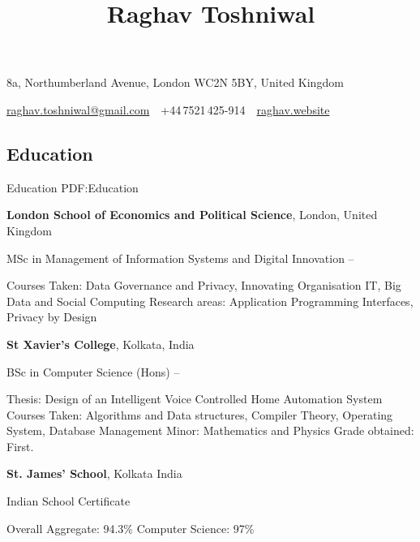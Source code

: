 \documentclass[letterpaper,10pt,oneside]{article}
\newcommand{\CVAuthor}{Raghav Toshniwal}
\newcommand{\CVWebpage}{http://raghav.website}
\begin{document}

\title{\CVAuthor}

\begin{subtitle}
{8a, Northumberland Avenue, London WC2N 5BY, United Kingdom}
\par
\href{mailto:raghav.toshniwal@gmail.com}
{raghav.toshniwal@gmail.com}
\,\SubBulletSymbol\,
+44\,7521\,425-914
\,\SubBulletSymbol\,
\href{\CVWebpage}
{raghav.website}
\end{subtitle}

\begin{body}


\section
{Education}
{Education}
{PDF:Education}

{\textbf{London School of Economics and Political Science}},
London, United Kingdom

\GapNoBreak
\BulletItem
MSc in
{Management of Information Systems and Digital Innovation}
\hfill
{} --
\begin{detail}
\SubBulletItem
Courses Taken:
{Data Governance and Privacy, Innovating Organisation IT, Big Data and Social Computing}
\SubBulletItem
Research areas:
Application Programming Interfaces, Privacy by Design
\end{detail}
\BigGap
{\textbf{St Xavier's College}},
Kolkata, India

\GapNoBreak
\BulletItem
BSc in
{Computer Science (Hons)}
\hfill
{} --
\begin{detail}
\SubBulletItem
Thesis:
{Design of an Intelligent Voice Controlled Home Automation System}
\SubBulletItem
Courses Taken:
Algorithms and Data structures, Compiler Theory, Operating System, Database Management
\SubBulletItem
Minor:
Mathematics and Physics
\SubBulletItem
Grade obtained:
First.
\end{detail}


\BigGap
{\textbf{St. James' School}},
Kolkata India

\GapNoBreak
\BulletItem
Indian School Certificate
\hfill
{}
\begin{detail}
\SubBulletItem
Overall Aggregate: 94.3\%
\SubBulletItem
Computer Science: 97\%
\end{detail}


\end{body}
\end{document}
